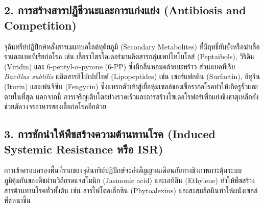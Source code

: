 \subsection{2. การสร้างสารปฏิชีวนะและการแก่งแย่ง (Antibiosis and Competition)}
จุลินทรีย์ปฏิปักษ์หลั่งสารเมแทบอไลต์ทุติยภูมิ (Secondary Metabolites) ที่มีฤทธิ์ยับยั้งหรือฆ่าเชื้อราและแบคทีเรียก่อโรค เช่น เชื้อราไตรโคเดอร์มาผลิตสารกลุ่มเพปไทโบโลส์ (Peptaibols), วิริดิน (Viridin) และ 6-pentyl-$\alpha$-pyrone (6-PP) ซึ่งมีกลิ่นหอมคล้ายมะพร้าว ส่วนแบคทีเรีย \textit{Bacillus subtilis} ผลิตสารลิโปเปปไทด์ (Lipopeptides) เช่น เซอร์แฟกติน (Surfactin), อิทูริน (Iturin) และเฟนจิซิน (Fengycin) ซึ่งแทรกตัวเข้าสู่เยื่อหุ้มเซลล์ของเชื้อราก่อโรคทำให้เกิดรูรั่วและตายในที่สุด นอกจากนี้ การเจริญเติบโตอย่างรวดเร็วและการสร้างไซเดอโรฟอร์เพื่อแย่งชิงธาตุเหล็กยังช่วยตัดวงจรอาหารของเชื้อก่อโรคอีกด้วย

\subsection{3. การชักนำให้พืชสร้างความต้านทานโรค (Induced Systemic Resistance หรือ ISR)}
การเข้าครอบครองพื้นที่รากของจุลินทรีย์ปฏิปักษ์จะส่งสัญญาณเตือนภัยทางชีวภาพกระตุ้นระบบภูมิคุ้มกันของพืชผ่านวิถีกรดแจสโมนิก (Jasmonic acid) และเอทิลีน (Ethylene) ทำให้พืชสร้างสารต้านทานโรคทั่วทั้งต้น เช่น สารไฟโตอเล็กซิน (Phytoalexins) และสะสมลิกนินทำให้ผนังเซลล์พืชหนาขึ้น

